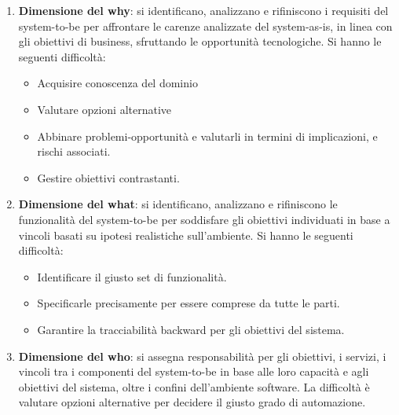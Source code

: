 \begin{enumerate}
    \item \textbf{Dimensione del why}: si identificano, analizzano e rifiniscono
          i requisiti del system-to-be per affrontare le carenze analizzate del
          system-as-is, in linea con gli obiettivi di business, sfruttando le opportunità
          tecnologiche. Si hanno le seguenti difficoltà:
          \begin{itemize}
              \item Acquisire conoscenza del dominio
              \item Valutare opzioni alternative
              \item Abbinare problemi-opportunità e valutarli in termini di implicazioni,
                    e rischi associati.
              \item Gestire obiettivi contrastanti.
          \end{itemize}
    \item \textbf{Dimensione del what}: si identificano, analizzano e rifiniscono
          le funzionalità del system-to-be per soddisfare gli obiettivi individuati in
          base a vincoli basati su ipotesi realistiche sull'ambiente. Si hanno le seguenti difficoltà:
          \begin{itemize}
              \item Identificare il giusto set di funzionalità.
              \item Specificarle precisamente per essere comprese da tutte le parti.
              \item Garantire la tracciabilità backward per gli obiettivi del sistema.
          \end{itemize}
    \item \textbf{Dimensione del who}: si assegna responsabilità per gli obiettivi,
          i servizi, i vincoli tra i componenti del system-to-be in base alle loro
          capacità e agli obiettivi del sistema, oltre i confini dell'ambiente software.
          La difficoltà è valutare opzioni alternative per decidere il giusto grado
          di automazione.
\end{enumerate}

